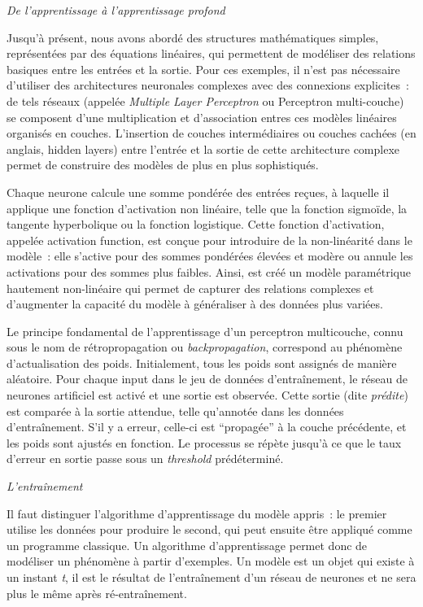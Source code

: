 \emph{De l'apprentissage à l'apprentissage profond}

Jusqu'à présent, nous avons abordé des structures mathématiques simples,
représentées par des équations linéaires, qui permettent de modéliser
des relations basiques entre les entrées et la sortie. Pour ces
exemples, il n'est pas nécessaire d'utiliser des architectures
neuronales complexes avec des connexions explicites~: de tels réseaux
(appelée \emph{Multiple Layer Perceptron} ou Perceptron multi-couche) se
composent d'une multiplication et d'association entres ces modèles
linéaires organisés en couches. L'insertion de couches intermédiaires ou
couches cachées (en anglais, hidden layers) entre l'entrée et la sortie
de cette architecture complexe permet de construire des modèles de plus
en plus sophistiqués.

Chaque neurone calcule une somme pondérée des entrées reçues, à laquelle
il applique une fonction d'activation non linéaire, telle que la
fonction sigmoïde, la tangente hyperbolique ou la fonction logistique.
Cette fonction d'activation, appelée activation function, est conçue
pour introduire de la non-linéarité dans le modèle~: elle s'active pour
des sommes pondérées élevées et modère ou annule les activations pour
des sommes plus faibles. Ainsi, est créé un modèle paramétrique
hautement non-linéaire qui permet de capturer des relations complexes et
d'augmenter la capacité du modèle à généraliser à des données plus
variées.

Le principe fondamental de l'apprentissage d'un perceptron multicouche,
connu sous le nom de rétropropagation ou \emph{backpropagation},
correspond au phénomène d'actualisation des poids. Initialement, tous
les poids sont assignés de manière aléatoire. Pour chaque input dans le
jeu de données d'entraînement, le réseau de neurones artificiel est
activé et une sortie est observée. Cette sortie (dite \emph{prédite})
est comparée à la sortie attendue, telle qu'annotée dans les données
d'entraînement. S'il y a erreur, celle-ci est ``propagée'' à la couche
précédente, et les poids sont ajustés en fonction. Le processus se
répète jusqu'à ce que le taux d'erreur en sortie passe sous un
\emph{threshold} prédéterminé.

\emph{L'entraînement}

Il faut distinguer l'algorithme d'apprentissage du modèle appris~: le
premier utilise les données pour produire le second, qui peut ensuite
être appliqué comme un programme classique. Un algorithme
d'apprentissage permet donc de modéliser un phénomène à partir
d'exemples. Un modèle est un objet qui existe à un instant \emph{t}, il
est le résultat de l'entraînement d'un réseau de neurones et ne sera
plus le même après ré-entraînement.

